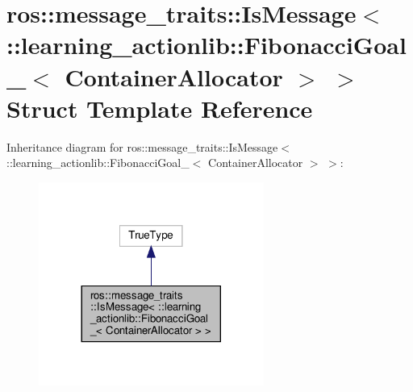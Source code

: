 \hypertarget{structros_1_1message__traits_1_1IsMessage_3_01_1_1learning__actionlib_1_1FibonacciGoal___3_01ContainerAllocator_01_4_01_4}{}\section{ros\+:\+:message\+\_\+traits\+:\+:Is\+Message$<$ \+:\+:learning\+\_\+actionlib\+:\+:Fibonacci\+Goal\+\_\+$<$ Container\+Allocator $>$ $>$ Struct Template Reference}
\label{structros_1_1message__traits_1_1IsMessage_3_01_1_1learning__actionlib_1_1FibonacciGoal___3_01ContainerAllocator_01_4_01_4}


Inheritance diagram for ros\+:\+:message\+\_\+traits\+:\+:Is\+Message$<$ \+:\+:learning\+\_\+actionlib\+:\+:Fibonacci\+Goal\+\_\+$<$ Container\+Allocator $>$ $>$\+:
\nopagebreak
\begin{figure}[H]
\begin{center}
\leavevmode
\includegraphics[width=209pt]{structros_1_1message__traits_1_1IsMessage_3_01_1_1learning__actionlib_1_1FibonacciGoal___3_01Con572535b71948d04435a199c6164b328b}
\end{center}
\end{figure}


